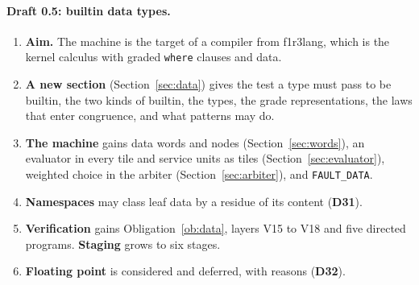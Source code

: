 \documentclass[10.5pt,a4paper]{extarticle}
\newcommand{\kw}[1]{\texttt{#1}}
\newcommand{\dec}[1]{\textbf{D#1}}
\theoremstyle{definition}
\theoremstyle{remark}
\begin{document}
\paragraph{Draft 0.5: builtin data types.}
\begin{enumerate}
\item \textbf{Aim.} The machine is the target of a compiler from f1r3lang,
which is the kernel calculus with graded \kw{where} clauses and data.
\item \textbf{A new section} (Section~\ref{sec:data}) gives the test a type
must pass to be builtin, the two kinds of builtin, the types, the grade
representations, the laws that enter congruence, and what patterns may do.
\item \textbf{The machine} gains data words and nodes
(Section~\ref{sec:words}), an evaluator in every tile and service units as
tiles (Section~\ref{sec:evaluator}), weighted choice in the arbiter
(Section~\ref{sec:arbiter}), and \kw{FAULT\_DATA}.
\item \textbf{Namespaces} may class leaf data by a residue of its content
(\dec{31}).
\item \textbf{Verification} gains Obligation~\ref{ob:data}, layers V15 to
V18 and five directed programs. \textbf{Staging} grows to six stages.
\item \textbf{Floating point} is considered and deferred, with reasons
(\dec{32}).
\end{enumerate}
\end{document}
